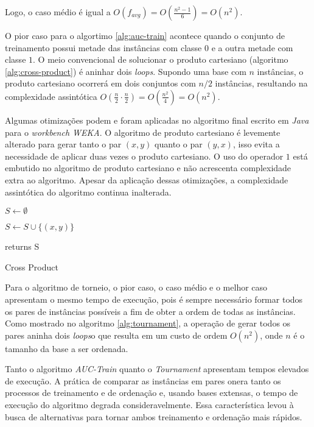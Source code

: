 Logo, o caso médio é igual a $O(f_{avg}) = O(\frac{n^2 -1}{6}) = O(n^2)$.

O pior caso para o algortimo \ref{alg:auc-train} acontece quando o conjunto de treinamento possui metade das instâncias com classe $0$ e a outra metade com classe $1$. O meio convencional de solucionar o produto cartesiano (algoritmo \ref{alg:cross-product}) é aninhar dois \emph{loops}. Supondo uma base com $n$ instâncias, o produto cartesiano ocorrerá em dois conjuntos com $n/2$ instâncias, resultando na complexidade assintótica $O(\frac{n}{2} \cdot \frac{n}{2}) = O(\frac{n^2}{4}) = O(n^2)$.

Algumas otimizações podem e foram aplicadas no algoritmo final escrito em \emph{Java} para o \emph{workbench WEKA}. O algoritmo de produto cartesiano é levemente alterado para gerar tanto o par $(x, y)$ quanto o par $(y, x)$, isso evita a necessidade de aplicar duas vezes o produto cartesiano. O uso do operador $1$ está embutido no algoritmo de produto cartesiano e não acrescenta complexidade extra ao algoritmo. Apesar da aplicação dessas otimizações, a complexidade assintótica do algoritmo continua inalterada.

\begin{algorithm}
    \begin{algorithmic}
        \STATE $S \gets \emptyset$

                \STATE $S \gets S \cup \{(x, y)\}$
            \ENDFOR
        \ENDFOR

        \STATE returns S

        \caption{Cross Product}
        \label{alg:cross-product}

    \end{algorithmic}
\end{algorithm}

Para o algoritmo de torneio, o pior caso, o caso médio e o melhor caso apresentam o mesmo tempo de execução, pois é sempre necessário formar todos os pares de instâncias possíveis a fim de obter a ordem de todas as instâncias. Como mostrado no algoritmo \ref{alg:tournament}, a operação de gerar todos os pares aninha dois \emph{loops}o que resulta em um custo de ordem $O(n^2)$, onde $n$ é o tamanho da base a ser ordenada.

Tanto o algoritmo \emph{AUC-Train} quanto o \emph{Tournament} apresentam tempos elevados de execução. A prática de comparar as instâncias em pares onera tanto os processos de treinamento e de ordenação e, usando bases extensas, o tempo de execução do algoritmo degrada consideravelmente. Essa característica levou à busca de alternativas para tornar ambos treinamento e ordenação mais rápidos.

